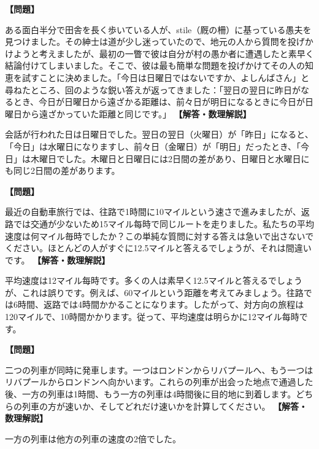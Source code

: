 \documentclass[10pt,a4paper,oneside,openany]{ltjsbook}
\begin{document}
\begin{tcolorbox}[colback=softblue,colframe=primaryblue,title=\textbf{第 66 問：村の愚か者 （原題: THE VILLAGE SIMPLETON.）},arc=2mm,boxrule=1pt,breakable]
\textbf{【問題】}\par\vspace{0.3em}
ある面白半分で田舎を長く歩いている人が、stile（厩の柵）に基っている愚夫を見つけました。その紳士は道が少し迷っていたので、地元の人から質問を投げかけようと考えましたが、最初の一瞥で彼は自分が村の愚か者に遭遇したと素早く結論付けてしまいました。そこで、彼は最も簡単な問題を投げかけてその人の知恵を試すことに決めました。「今日は日曜日ではないですか、よしんばさん」と尋ねたところ、回のような鋭い答えが返ってきました：「翌日の翌日に昨日がなるとき、今日が日曜日から遠ざかる距離は、前々日が明日になるときに今日が日曜日から遠ざかっていた距離と同じです。」
\tcblower
\textbf{【解答・数理解説】}\par\vspace{0.3em}
会話が行われた日は日曜日でした。翌日の翌日（火曜日）が「昨日」になると、「今日」は水曜日になりますし、前々日（金曜日）が「明日」だったとき、「今日」は木曜日でした。木曜日と日曜日には2日間の差があり、日曜日と水曜日にも同じ2日間の差があります。
\end{tcolorbox}

\begin{tcolorbox}[colback=softblue,colframe=primaryblue,title=\textbf{第 67 問：平均速度 （原題: AVERAGE SPEED.）},arc=2mm,boxrule=1pt,breakable]
\textbf{【問題】}\par\vspace{0.3em}
最近の自動車旅行では、往路で1時間に10マイルという速さで進みましたが、返路では交通が少ないため15マイル每時で同じルートを走りました。私たちの平均速度は何マイル毎時でしたか？この単純な質問に対する答えは急いで出さないでください。ほとんどの人がすぐに12.5マイルと答えるでしょうが、それは間違いです。
\tcblower
\textbf{【解答・数理解説】}\par\vspace{0.3em}
平均速度は12マイル每時です。多くの人は素早く12.5マイルと答えるでしょうが、これは誤りです。例えば、60マイルという距離を考えてみましょう。往路では6時間、返路では4時間かかることになります。したがって、対方向の旅程は120マイルで、10時間かかります。従って、平均速度は明らかに12マイル每時です。
\end{tcolorbox}

\begin{tcolorbox}[colback=softblue,colframe=primaryblue,title=\textbf{第 68 問：二冊の列車 （原題: THE TWO TRAINS.）},arc=2mm,boxrule=1pt,breakable]
\textbf{【問題】}\par\vspace{0.3em}
二つの列車が同時に発車します。一つはロンドンからリバプールへ、もう一つはリバプールからロンドンへ向かいます。これらの列車が出会った地点で通過した後、一方の列車は1時間、もう一方の列車は4時間後に目的地に到着します。どちらの列車の方が速いか、そしてどれだけ速いかを計算してください。
\tcblower
\textbf{【解答・数理解説】}\par\vspace{0.3em}
一方の列車は他方の列車の速度の2倍でした。
\end{tcolorbox}
\end{document}
